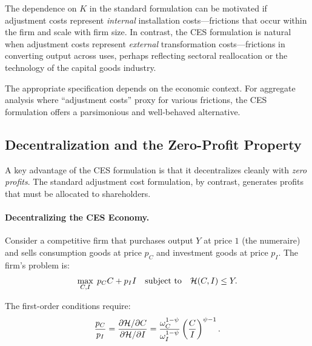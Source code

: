 \begin{calloutcaution}
The dependence on $K$ in the standard formulation can be motivated if adjustment costs represent \emph{internal} installation costs---frictions that occur within the firm and scale with firm size. In contrast, the CES formulation is natural when adjustment costs represent \emph{external} transformation costs---frictions in converting output across uses, perhaps reflecting sectoral reallocation or the technology of the capital goods industry.

The appropriate specification depends on the economic context. For aggregate analysis where ``adjustment costs'' proxy for various frictions, the CES formulation offers a parsimonious and well-behaved alternative.
\end{calloutcaution}

\subsection{Decentralization and the Zero-Profit Property}
\label{subsec:ac-decentralization}

A key advantage of the CES formulation is that it decentralizes cleanly with \emph{zero profits}. The standard adjustment cost formulation, by contrast, generates profits that must be allocated to shareholders.

\paragraph{Decentralizing the CES Economy.}
Consider a competitive firm that purchases output $Y$ at price $1$ (the numeraire) and sells consumption goods at price $p_C$ and investment goods at price $p_I$. The firm's problem is:
\begin{equation}
\max_{C, I} \; p_C C + p_I I \quad \text{subject to} \quad \mathcal{H}(C, I) \leq Y.
\label{eq:ac-firm-problem}
\end{equation}

The first-order conditions require:
\begin{equation}
\frac{p_C}{p_I} = \frac{\partial \mathcal{H} / \partial C}{\partial \mathcal{H} / \partial I} = \frac{\omega_C^{1-\psi}}{\omega_I^{1-\psi}} \left( \frac{C}{I} \right)^{\psi - 1}.
\label{eq:ac-firm-foc}
\end{equation}

